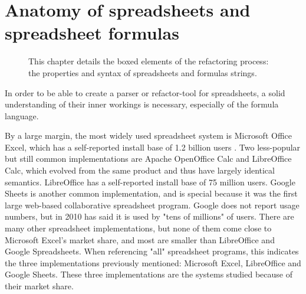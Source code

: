 
\chapter{Anatomy of spreadsheets and spreadsheet formulas}
\label{chapter:anatomy}

\noindent
\begin{figure}[h]
\centerfloat

\caption{This chapter details the boxed elements of the refactoring process: the properties and syntax of spreadsheets and formulas strings.}
\end{figure}

In order to be able to create a parser or refactor-tool for spreadsheets, a solid understanding of their inner workings is necessary, especially of the formula language.

By a large margin, the most widely used spreadsheet system is Microsoft Office Excel, which has a self-reported install base of 1.2 billion users \cite{microsoftByTheNumbers}.
Two less-popular but still common implementations are Apache OpenOffice Calc and LibreOffice Calc, which evolved from the same product and thus have largely identical semantics.
LibreOffice has a self-reported install base of 75 million users.
Google Sheets is another common implementation, and is special because it was the first large web-based collaborative spreadsheet program.
Google does not report usage numbers, but in 2010 has said it is used by "tens of millions" of users.
There are many other spreadsheet implementations, but none of them come close to Microsoft Excel's market share, and most are smaller than LibreOffice and Google Spreadsheets.
When referencing "all" spreadsheet programs, this indicates the three implementations previously mentioned: Microsoft Excel, LibreOffice and Google Sheets.
These three implementations are the systems studied because of their market share.

\newpage

